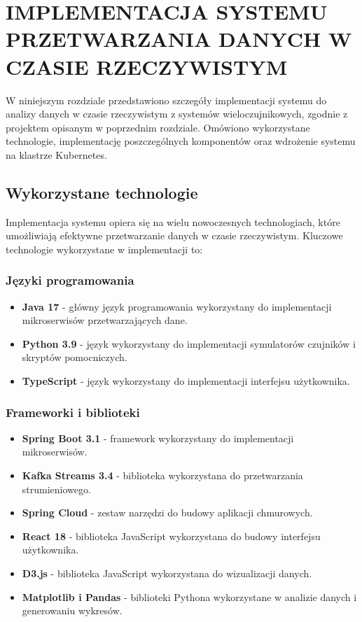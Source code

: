 \section{IMPLEMENTACJA SYSTEMU PRZETWARZANIA DANYCH W CZASIE RZECZYWISTYM}
\label{sec:implementacja_systemu}

W niniejszym rozdziale przedstawiono szczegóły implementacji systemu do analizy danych w czasie rzeczywistym z systemów wieloczujnikowych, zgodnie z projektem opisanym w poprzednim rozdziale. Omówiono wykorzystane technologie, implementację poszczególnych komponentów oraz wdrożenie systemu na klastrze Kubernetes.

\subsection{Wykorzystane technologie}
\label{subsec:technologie}

Implementacja systemu opiera się na wielu nowoczesnych technologiach, które umożliwiają efektywne przetwarzanie danych w czasie rzeczywistym. Kluczowe technologie wykorzystane w implementacji to:

\subsubsection{Języki programowania}
\label{subsubsec:jezyki_programowania}

\begin{itemize}
    \item \textbf{Java 17} - główny język programowania wykorzystany do implementacji mikroserwisów przetwarzających dane.
    \item \textbf{Python 3.9} - język wykorzystany do implementacji symulatorów czujników i skryptów pomocniczych.
    \item \textbf{TypeScript} - język wykorzystany do implementacji interfejsu użytkownika.
\end{itemize}

\subsubsection{Frameworki i biblioteki}
\label{subsubsec:frameworki}

\begin{itemize}
    \item \textbf{Spring Boot 3.1} - framework wykorzystany do implementacji mikroserwisów.
    \item \textbf{Kafka Streams 3.4} - biblioteka wykorzystana do przetwarzania strumieniowego.
    \item \textbf{Spring Cloud} - zestaw narzędzi do budowy aplikacji chmurowych.
    \item \textbf{React 18} - biblioteka JavaScript wykorzystana do budowy interfejsu użytkownika.
    \item \textbf{D3.js} - biblioteka JavaScript wykorzystana do wizualizacji danych.
    \item \textbf{Matplotlib i Pandas} - biblioteki Pythona wykorzystane w analizie danych i generowaniu wykresów.
\end{itemize}

